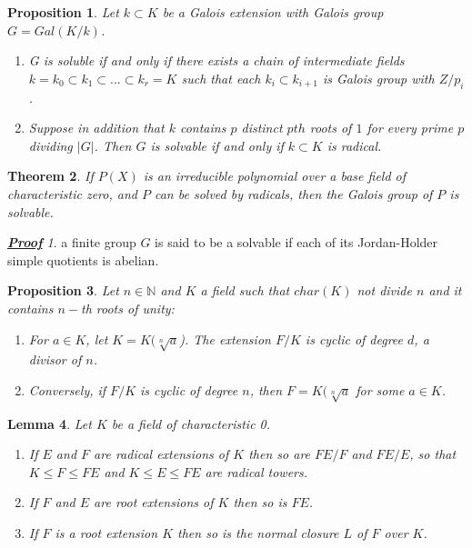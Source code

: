 \documentclass[a4paper, 10pt]{article}
\providecommand{\abs}[1]{\lvert#1\rvert}
\theoremstyle{plain}
\newtheorem{teorema}{Theorem}[section]
\newtheorem{proposicion}[teorema]{Proposition}
\newtheorem{lema}[teorema]{Lemma}
\theoremstyle{definition}
\theoremstyle{remark}
\newtheorem*{prueba}{\textbf{\textit{\underline{Proof}}}}
\begin{document}
    \begin{proposicion}
        Let $k\subset K$ be a Galois extension with Galois group $G=Gal(K/k)$.
        
        \begin{enumerate}
            \item G is soluble if and only if there exists a chain of intermediate fields $k=k_0\subset k_1\subset ... \subset k_r=K$ such that each $k_i\subset k_{i+1}$ is Galois group with $Z/p_i$.
            \item Suppose in addition that $k$ contains $p$ distinct $pth$ roots of $1$ for every prime $p$ dividing $\abs{G}$. Then $G$ is solvable if and only if $k\subset K$ is radical.
        \end{enumerate}
    \end{proposicion}

    \begin{teorema}
        If $P(X)$ is an irreducible polynomial over a base field of characteristic zero, and $P$ can be solved by radicals, then the Galois group of $P$ is solvable.
    \end{teorema}

    \begin{prueba}
        a finite group $G$ is said to be a solvable if each of its Jordan-Holder simple quotients is abelian.
    \end{prueba}

    \begin{proposicion}
        Let $n\in \mathbb{N}$ and $K$ a field such that $char(K)$ not divide $n$ and it contains $n-$th roots of unity:
        \begin{enumerate}
            \item For $a\in K$, let $K=K(\sqrt[n]{a}$). The extension $F/K$ is cyclic of degree $d$, a divisor of $n$.
            \item Conversely, if $F/K$ is cyclic of degree $n$, then $F=K(\sqrt[n]{a}$ for some $a\in K$.
        \end{enumerate}
    \end{proposicion}

    \begin{lema}
        Let $K$ be a field of characteristic 0.
        \begin{enumerate}
            \item If $E$ and $F$ are radical extensions of $K$ then so are $FE/F$ and $FE/E$, so that $K\leq F\leq FE$ and $K\leq E\leq FE$ are radical towers.
            \item If $F$ and $E$ are root extensions of $K$ then so is $FE$.
            \item If $F$ is a root extension $K$ then so is the normal closure $L$ of $F$ over $K$.
        \end{enumerate}
    \end{lema}
\end{document}
